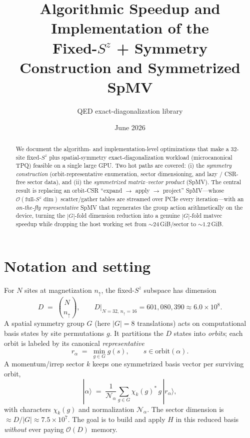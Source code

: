 \documentclass[11pt]{article}
\title{Algorithmic Speedup and Implementation of the\\
       Fixed-$S^z$ + Symmetry Construction and Symmetrized SpMV}
\author{QED exact-diagonalization library}
\date{June 2026}
\newcommand{\bigO}{\mathcal{O}}
\newcommand{\Norm}{\mathcal{N}}
\begin{document}
\maketitle

\begin{abstract}
We document the algorithm- and implementation-level optimizations that make a
32-site fixed-$S^z$ plus spatial-symmetry exact-diagonalization workload
(microcanonical TPQ) feasible on a single large GPU. Two hot paths are covered:
(i) the \emph{symmetry construction} (orbit-representative enumeration, sector
dimensioning, and lazy / CSR-free sector data), and (ii) the \emph{symmetrized
matrix--vector product} (SpMV). The central result is replacing an orbit-CSR
``expand $\rightarrow$ apply $\rightarrow$ project'' SpMV---whose
$\mathcal{O}(\text{full-}S^z\text{ dim})$ scatter/gather tables are streamed over
PCIe every iteration---with an \emph{on-the-fly representative} SpMV that
regenerates the group action arithmetically on the device, turning the
$|G|$-fold dimension reduction into a genuine $|G|$-fold matvec speedup while
dropping the host working set from ${\sim}24$\,GiB/sector to ${\sim}1.2$\,GiB.
\end{abstract}

\section{Notation and setting}

For $N$ sites at magnetization $n_{\uparrow}$, the fixed-$S^z$ subspace has
dimension
\[
  D \;=\; \binom{N}{n_{\uparrow}},
  \qquad
  D\big|_{N=32,\,n_{\uparrow}=16} = 601{,}080{,}390 \approx 6.0\times 10^{8}.
\]
A spatial symmetry group $G$ (here $|G|=8$ translations) acts on computational
basis states by site permutations $g$. It partitions the $D$ states into
\emph{orbits}; each orbit is labeled by its canonical \emph{representative}
\[
  r_\alpha \;=\; \min_{g\in G} g(s),\qquad s\in \text{orbit}(\alpha).
\]
A momentum/irrep sector $k$ keeps one symmetrized basis vector per surviving
orbit,
\begin{equation}
  |\alpha\rangle
   \;=\; \frac{1}{\Norm_\alpha}\sum_{g\in G}\chi_k(g)^{*}\, g\,|r_\alpha\rangle,
  \label{eq:symvec}
\end{equation}
with characters $\chi_k(g)$ and normalization $\Norm_\alpha$. The sector
dimension is $\approx D/|G| \approx 7.5\times 10^{7}$. The goal is to build and
apply $H$ in this reduced basis \emph{without} ever paying $\bigO(D)$ memory.
\end{document}
